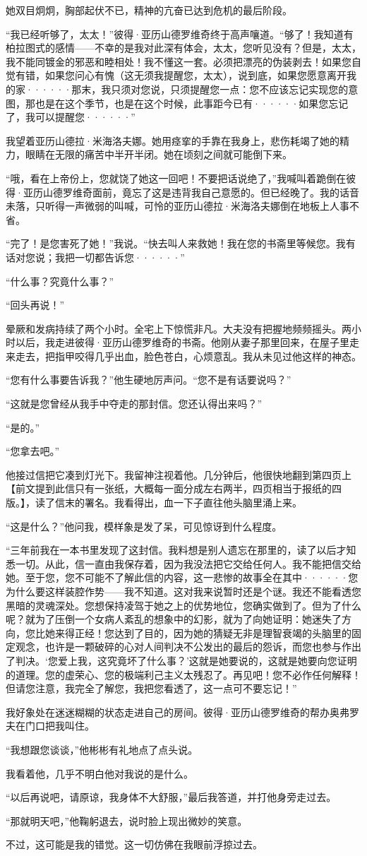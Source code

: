 \documentclass[12pt, UTF8]{ctexbook}
\begin{document}
\par 她双目炯炯，胸部起伏不已，精神的亢奋已达到危机的最后阶段。
\par “我已经听够了，太太！”彼得·亚历山德罗维奇终于高声嚷道。“够了！我知道有柏拉图式的感情——不幸的是我对此深有体会，太太，您听见没有？但是，太太，我不能同镀金的邪恶和睦相处！我不懂这一套。必须把漂亮的伪装剥去！如果您自觉有错，如果您问心有愧（这无须我提醒您，太太），说到底，如果您愿意离开我的家······那末，我只须对您说，只须提醒您一点：您不应该忘记实现您的意图，那也是在这个季节，也是在这个时候，此事距今已有······如果您忘记了，我可以提醒您······”
\par 我望着亚历山德拉·米海洛夫娜。她用痉挛的手靠在我身上，悲伤耗竭了她的精力，眼睛在无限的痛苦中半开半闭。她在顷刻之间就可能倒下来。
\par “哦，看在上帝份上，您就饶了她这一回吧！不要把话说绝了，”我喊叫着跪倒在彼得·亚历山德罗维奇面前，竟忘了这是违背我自己意愿的。但已经晚了。我的话音未落，只听得一声微弱的叫喊，可怜的亚历山德拉·米海洛夫娜倒在地板上人事不省。
\par “完了！是您害死了她！”我说。“快去叫人来救她！我在您的书斋里等候您。我有话对您说；我把一切都告诉您······”
\par “什么事？究竟什么事？”
\par “回头再说！”
\par 晕厥和发病持续了两个小时。全宅上下惊慌非凡。大夫没有把握地频频摇头。两小时以后，我走进彼得·亚历山德罗维奇的书斋。他刚从妻子那里回来，在屋子里走来走去，把指甲咬得几乎出血，脸色苍白，心烦意乱。我从未见过他这样的神态。
\par “您有什么事要告诉我？”他生硬地厉声问。“您不是有话要说吗？”
\par “这就是您曾经从我手中夺走的那封信。您还认得出来吗？”
\par “是的。”
\par “您拿去吧。”
\par 他接过信把它凑到灯光下。我留神注视着他。几分钟后，他很快地翻到第四页上【前文提到此信只有一张纸，大概每一面分成左右两半，四页相当于报纸的四版。】，读了信末的署名。我看得出，血一下子直往他头脑里涌上来。
\par “这是什么？”他问我，模样象是发了呆，可见惊讶到什么程度。
\par “三年前我在一本书里发现了这封信。我料想是别人遗忘在那里的，读了以后才知悉一切。从此，信一直由我保存着，因为我没法把它交给任何人。我不能把信交给她。至于您，您不可能不了解此信的内容，这一悲惨的故事全在其中······您为什么要这样装腔作势——我不知道。这对我来说暂时还是个谜。我还不能看透您黑暗的灵魂深处。您想保持凌驾于她之上的优势地位，您确实做到了。但为了什么呢？就为了压倒一个女病人紊乱的想象中的幻影，就为了向她证明：她迷失了方向，您比她来得正经！您达到了目的，因为她的猜疑无非是理智衰竭的头脑里的固定观念，也许是一颗破碎的心对人间判决不公发出的最后的怨诉，而您也参与作出了判决。‘您爱上我，这究竟坏了什么事？’这就是她要说的，这就是她要向您证明的道理。您的虚荣心、您的极端利己主义太残忍了。再见吧！您不必作任何解释！但请您注意，我完全了解您，我把您看透了，这一点可不要忘记！”
\par 我好象处在迷迷糊糊的状态走进自己的房间。彼得·亚历山德罗维奇的帮办奥弗罗夫在门口把我叫住。
\par “我想跟您谈谈，”他彬彬有礼地点了点头说。
\par 我看着他，几乎不明白他对我说的是什么。
\par “以后再说吧，请原谅，我身体不大舒服，”最后我答道，并打他身旁走过去。
\par “那就明天吧，”他鞠躬退去，说时脸上现出微妙的笑意。
\par 不过，这可能是我的错觉。这一切仿佛在我眼前浮掠过去。
\end{document}
